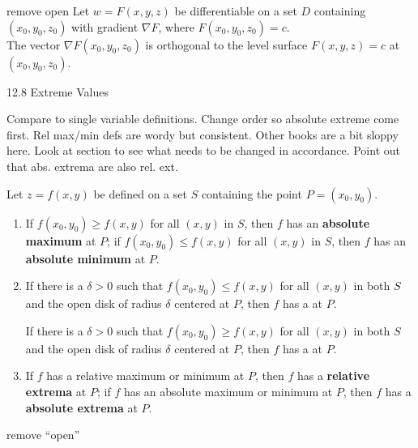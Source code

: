 \documentclass{article}
\begin{document}
remove open
{Let $w=F(x,y,z)$ be differentiable on a set $D$ containing $(x_0,y_0,z_0)$ with gradient $\nabla F$, where $F(x_0,y_0,z_0) = c$. \\

The vector $\nabla F(x_0,y_0,z_0)$ is orthogonal to the level surface $F(x,y,z)=c$ at $(x_0,y_0,z_0)$.
}

12.8 Extreme Values

Compare to single variable definitions. Change order so absolute extreme come first. Rel max/min defs are wordy but consistent. Other books are a bit sloppy here.   Look at section to see what needs to be changed in accordance. Point out that abs. extrema are also rel. ext.

{Let $z=f(x,y)$ be defined on a set $S$ containing the point $P=(x_0,y_0)$.
\begin{enumerate}
	\item	If $f(x_0,y_0)\geq f(x,y)$ for all $(x,y)$ in $S$, then $f$ has an \textbf{absolute maximum} at $P$; if $f(x_0,y_0)\leq f(x,y)$ for all $(x,y)$ in $S$, then $f$ has an \textbf{absolute minimum} at $P$.
	
\item If there is a $\delta>0$ such that $f(x_0,y_0) \leq f(x,y)$ for all $(x,y)$ in both $S$ and the open disk of radius $\delta$ centered at $P$, then $f$ has a  at $P$.

If there is a $\delta>0$ such that $f(x_0,y_0) \geq f(x,y)$ for all $(x,y)$ in both $S$ and the open disk of radius $\delta$ centered at $P$, then $f$ has a  at $P$.


	
		\item		If $f$ has a relative maximum or minimum at $P$, then $f$ has a \textbf{relative extrema} at $P$; if $f$ has an absolute maximum or minimum at $P$, then $f$ has a \textbf{absolute extrema} at $P$.
\end{enumerate}
}
remove ``open''
\end{document}
